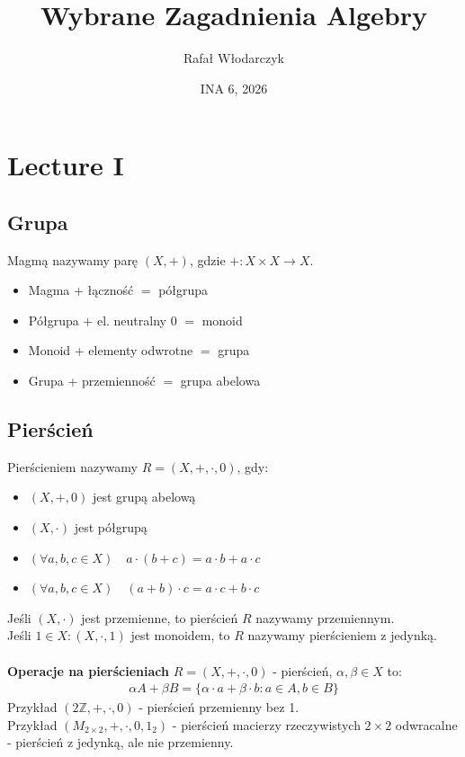 \documentclass{article}
\title{Wybrane Zagadnienia Algebry}
\author{Rafał Włodarczyk}
\date{INA 6, 2026}
\numberwithin{equation}{subsection}
\begin{document}
\maketitle

\tableofcontents

\newpage

\section{Lecture I}

\subsection{Grupa}

Magmą nazywamy parę $(X,+)$, gdzie $+: X\times X \to X$.
\begin{itemize}
    \item Magma + łączność $=$ półgrupa
    \item Półgrupa + el. neutralny $0$ $=$ monoid
    \item Monoid + elementy odwrotne $=$ grupa
    \item Grupa + przemienność $=$ grupa abelowa
\end{itemize}

\subsection{Pierścień}

Pierścieniem nazywamy $R=(X,+,\cdot,0)$, gdy:
\begin{itemize}
    \item $(X,+,0)$ jest grupą abelową
    \item $(X,\cdot)$ jest półgrupą
    \item $(\forall a,b,c\in X) \quad a\cdot(b+c) = a\cdot b + a\cdot c$
    \item $(\forall a,b,c\in X) \quad (a+b)\cdot c = a\cdot c + b\cdot c$
\end{itemize}
Jeśli $(X,\cdot)$ jest przemienne, to pierścień $R$ nazywamy przemiennym.\\
Jeśli $1\in X : (X,\cdot,1)$ jest monoidem, to $R$ nazywamy pierścieniem z jedynką.\\\\
\textbf{Operacje na pierścieniach}
$R=(X,+,\cdot,0)$ - pierścień, $\alpha,\beta \in X$ to:
\begin{align*}
    \alpha A + \beta B = \{\alpha \cdot a + \beta \cdot b : a\in A, b \in B\}
\end{align*}
Przykład $(2\mathbb{Z},+,\cdot,0)$ - pierścień przemienny bez 1.\\
Przykład $(M_{2 \times 2}, +,\cdot,0,1_2)$ - pierścień macierzy rzeczywistych $2\times 2$ odwracalne - pierścień z jedynką, ale nie przemienny.\\
\end{document}
